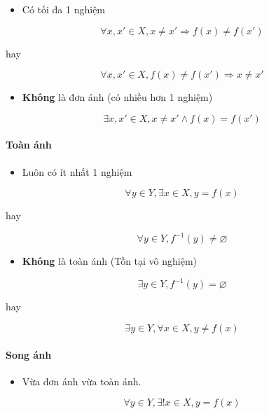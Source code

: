 \documentclass[11pt]{article}
\providecommand{\tightlist}{%
      \setlength{\itemsep}{0pt}\setlength{\parskip}{0pt}}
\begin{document}
\begin{itemize}
\tightlist
\item
  Có tối đa 1 nghiệm
\end{itemize}

\[
\forall x, x' \in X, x \neq x' \Rightarrow f(x) \neq f(x')
\]

hay

\[
\forall x, x' \in X, f(x) \neq f(x') \Rightarrow x \neq x' 
\]

\begin{itemize}
\tightlist
\item
  \textbf{Không} là đơn ánh (có nhiều hơn 1 nghiệm)
\end{itemize}

\[
\exists x, x' \in X, x \neq x' \land f(x) = f(x')
\]

    \paragraph{Toàn ánh}\label{touxe0n-uxe1nh}

\begin{itemize}
\tightlist
\item
  Luôn có ít nhất 1 nghiệm
\end{itemize}

\[
\forall y \in Y, \exists x \in X, y=f(x)
\]

hay

\[
\forall y \in Y, f^{-1}(y) \neq \varnothing
\]

\begin{itemize}
\tightlist
\item
  \textbf{Không} là toàn ánh (Tồn tại vô nghiệm)
\end{itemize}

\[
\exists y \in Y, f^{-1} (y) = \varnothing
\]

hay

\[
\exists y \in Y, \forall x \in X, y \neq f(x)
\]

    \paragraph{Song ánh}\label{song-uxe1nh}

\begin{itemize}
\tightlist
\item
  Vừa đơn ánh vừa toàn ánh.
\end{itemize}

\[
\forall y \in Y, \exists ! x \in X, y = f(x)
\]
\end{document}
